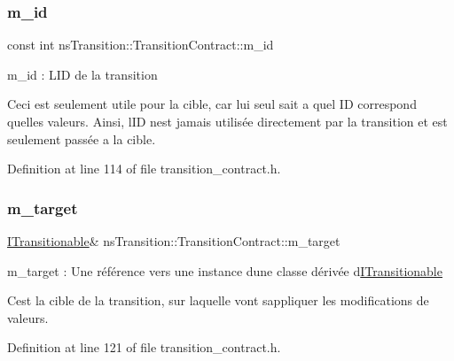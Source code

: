 \subsubsection{\texorpdfstring{m\+\_\+id}{m\_id}}
{\footnotesize\ttfamily const int ns\+Transition\+::\+Transition\+Contract\+::m\+\_\+id\hspace{0.3cm}{\ttfamily [protected]}}



m\+\_\+id \+: L\textquotesingle{}ID de la transition 

Ceci est seulement utile pour la cible, car lui seul sait a quel ID correspond quelles valeurs. Ainsi, l\textquotesingle{}ID n\textquotesingle{}est jamais utilisée directement par la transition et est seulement passée a la cible. 

Definition at line 114 of file transition\+\_\+contract.\+h.

\mbox{\label{classns_transition_1_1_transition_contract_a1066c3c1526a519276b75a4f4c5206b2}} 
\subsubsection{\texorpdfstring{m\+\_\+target}{m\_target}}
{\footnotesize\ttfamily \hyperlink{classns_transition_1_1_i_transitionable}{I\+Transitionable}\& ns\+Transition\+::\+Transition\+Contract\+::m\+\_\+target\hspace{0.3cm}{\ttfamily [protected]}}



m\+\_\+target \+: Une référence vers une instance d\textquotesingle{}une classe dérivée d\textquotesingle{}\hyperlink{classns_transition_1_1_i_transitionable}{I\+Transitionable} 

C\textquotesingle{}est la cible de la transition, sur laquelle vont s\textquotesingle{}appliquer les modifications de valeurs. 

Definition at line 121 of file transition\+\_\+contract.\+h.

\mbox{\label{classns_transition_1_1_transition_contract_a9634edf746d8605e78ae30f7a0e6efd3}} 
